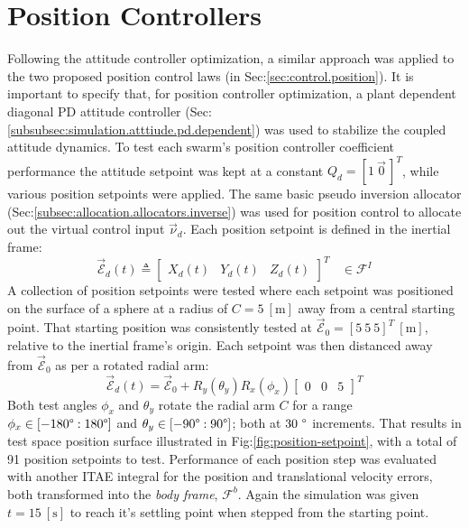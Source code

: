 \section{Position Controllers}
\label{sec:simulation.position}
Following the attitude controller optimization, a similar approach was applied to the two proposed position control laws (in Sec:\ref{sec:control.position}). It is important to specify that, for position controller optimization, a plant dependent diagonal PD attitude controller (Sec:\ref{subsubsec:simulation.atttiude.pd.dependent}) was used to stabilize the coupled attitude dynamics. To test each swarm's position controller coefficient performance the attitude setpoint was kept at a constant $Q_d=[1~\vec{0}\hspace{2pt}]^T$, while various position setpoints were applied. The same basic pseudo inversion allocator (Sec:\ref{subsec:allocation.allocators.inverse}) was used for position control to allocate out the virtual control input $\vec{\nu}_d$. Each position setpoint is defined in the inertial frame:
\begin{equation}
\vec{\mathcal{E}}_d(t)\triangleq\begin{bmatrix}
X_d(t)&
Y_d(t)&
Z_d(t)
\end{bmatrix}^T
~~~~\in\mathcal{F}^{I}
\end{equation}
A collection of position setpoints were tested where each setpoint was positioned on the surface of a sphere at a radius of $C=5~[\text{m}]$ away from a central starting point. That starting position was consistently tested at $\vec{\mathcal{E}}_0=[5~5~5]^{T}~[\text{m}]$, relative to the inertial frame's origin. Each setpoint was then distanced away from $\vec{\mathcal{E}}_0$ as per a rotated radial arm:
\begin{equation}
\vec{\mathcal{E}}_d(t)=\vec{\mathcal{E}}_0+R_y(\theta_{y})R_x(\phi_{x})\begin{bmatrix}
0 & 0 & 5
\end{bmatrix}^T
\end{equation}
Both test angles $\phi_x$ and $\theta_y$ rotate the radial arm  $C$ for a range $\phi_x\in[-180\text{\textdegree}:180\text{\textdegree}]$ and $\theta_y\in[-90\text{\textdegree}:90\text{\textdegree}]$; both at $30~\text{\textdegree}$ increments. That results in test space position surface illustrated in Fig:\ref{fig:position-setpoint}, with a total of 91 position setpoints to test. Performance of each position step was evaluated with another ITAE integral for the position and translational velocity errors, both transformed into the \emph{body frame}, $\mathcal{F}^{b}$. Again the simulation was given $t=15~[\text{s}]$ to reach it's settling point when stepped from the starting point.
